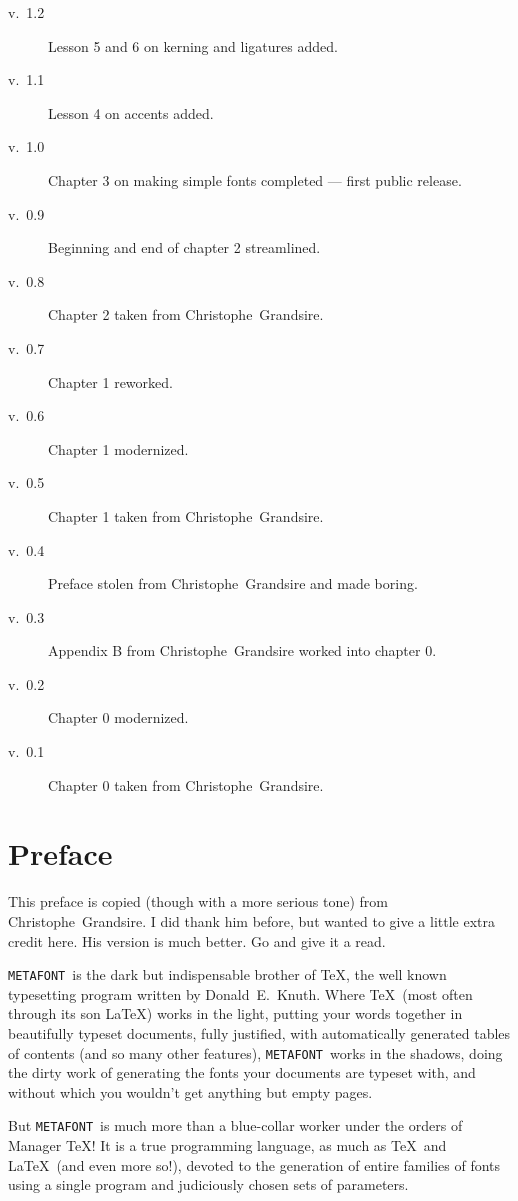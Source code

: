 \documentclass[a4paper,11pt,twoside]{book}
\newcommand{\MF}{{\tt METAFONT}}
\begin{document}
\begin{description}
\item[v.~1.2] Lesson 5 and 6 on kerning and ligatures added.
\item[v.~1.1] Lesson 4 on accents added.
\item[v.~1.0] Chapter 3 on making simple fonts completed --- first public release.
\item[v.~0.9] Beginning and end of chapter 2 streamlined.
\item[v.~0.8] Chapter 2 taken from Christophe~Grandsire.
\item[v.~0.7] Chapter 1 reworked.
\item[v.~0.6] Chapter 1 modernized.
\item[v.~0.5] Chapter 1 taken from Christophe~Grandsire.
\item[v.~0.4] Preface stolen from Christophe~Grandsire and made boring.
\item[v.~0.3] Appendix B from Christophe~Grandsire worked into chapter 0.
\item[v.~0.2] Chapter 0 modernized.
\item[v.~0.1] Chapter 0 taken from Christophe~Grandsire.
\end{description}

\chapter{Preface}

\begin{framed}
This preface is copied (though with a more serious tone) from Christophe~Grandsire.
I did thank him before, but wanted to give a little extra credit here.
His version is much better.
Go and give it a read.
\end{framed}

\MF\ is the dark but indispensable brother of \TeX, the well known typesetting program written by
Donald~E.~Knuth.
Where \TeX\ (most often through its son \LaTeX) works in the light, putting your words together in
beautifully typeset documents, fully justified, with automatically generated tables of contents
(and so many other features), \MF\ works in the shadows, doing the dirty work of generating the
fonts your documents are typeset with, and without which you wouldn't get anything but empty pages.

But \MF\ is much more than a blue-collar worker under the orders of Manager \TeX! It is a true
programming language, as much as \TeX\ and \LaTeX\ (and even more so!), devoted to the generation
of entire families of fonts using a single program and judiciously chosen sets of parameters.
\end{document}

